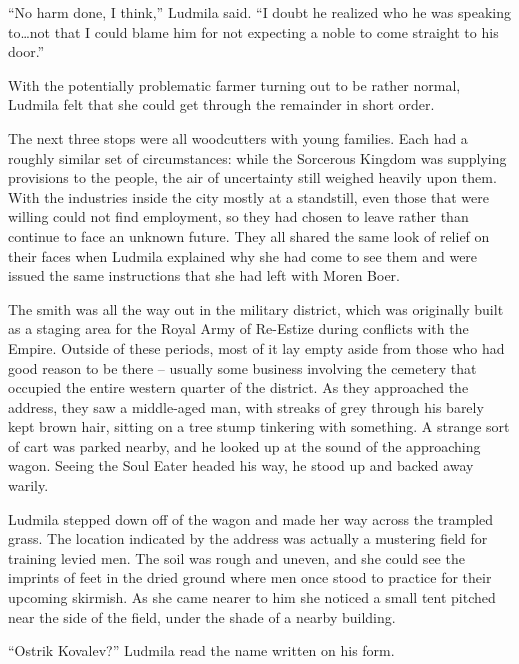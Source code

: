  

“No harm done, I think,” Ludmila said. “I doubt he realized who he was speaking to…not that I could blame him for not expecting a noble to come straight to his door.”

 

With the potentially problematic farmer turning out to be rather normal, Ludmila felt that she could get through the remainder in short order.

 

The next three stops were all woodcutters with young families. Each had a roughly similar set of circumstances: while the Sorcerous Kingdom was supplying provisions to the people, the air of uncertainty still weighed heavily upon them. With the industries inside the city mostly at a standstill, even those that were willing could not find employment, so they had chosen to leave rather than continue to face an unknown future. They all shared the same look of relief on their faces when Ludmila explained why she had come to see them and were issued the same instructions that she had left with Moren Boer.

 

The smith was all the way out in the military district, which was originally built as a staging area for the Royal Army of Re-Estize during conflicts with the Empire. Outside of these periods, most of it lay empty aside from those who had good reason to be there – usually some business involving the cemetery that occupied the entire western quarter of the district. As they approached the address, they saw a middle-aged man, with streaks of grey through his barely kept brown hair, sitting on a tree stump tinkering with something. A strange sort of cart was parked nearby, and he looked up at the sound of the approaching wagon. Seeing the Soul Eater headed his way, he stood up and backed away warily.

 

Ludmila stepped down off of the wagon and made her way across the trampled grass. The location indicated by the address was actually a mustering field for training levied men. The soil was rough and uneven, and she could see the imprints of feet in the dried ground where men once stood to practice for their upcoming skirmish. As she came nearer to him she noticed a small tent pitched near the side of the field, under the shade of a nearby building.

 

“Ostrik Kovalev?” Ludmila read the name written on his form.

